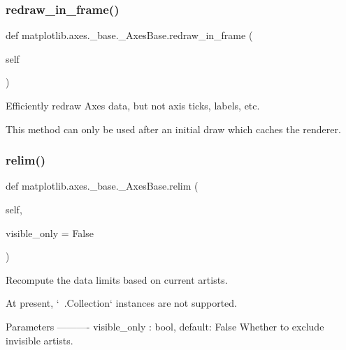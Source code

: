 \subsubsection{\texorpdfstring{redraw\+\_\+in\+\_\+frame()}{redraw\_in\_frame()}}
{\footnotesize\ttfamily def matplotlib.\+axes.\+\_\+base.\+\_\+\+Axes\+Base.\+redraw\+\_\+in\+\_\+frame (\begin{DoxyParamCaption}\item[{}]{self }\end{DoxyParamCaption})}

\begin{DoxyVerb}Efficiently redraw Axes data, but not axis ticks, labels, etc.

This method can only be used after an initial draw which caches the
renderer.
\end{DoxyVerb}
 \mbox{\label{classmatplotlib_1_1axes_1_1__base_1_1__AxesBase_a0deb77111cb5fa0c8805bffecd04784b}} 
\subsubsection{\texorpdfstring{relim()}{relim()}}
{\footnotesize\ttfamily def matplotlib.\+axes.\+\_\+base.\+\_\+\+Axes\+Base.\+relim (\begin{DoxyParamCaption}\item[{}]{self,  }\item[{}]{visible\+\_\+only = {\ttfamily False} }\end{DoxyParamCaption})}

\begin{DoxyVerb}Recompute the data limits based on current artists.

At present, `~.Collection` instances are not supported.

Parameters
----------
visible_only : bool, default: False
    Whether to exclude invisible artists.
\end{DoxyVerb}
 \mbox{\label{classmatplotlib_1_1axes_1_1__base_1_1__AxesBase_a37401f0094669f543e6ad7778fe04271}} 
